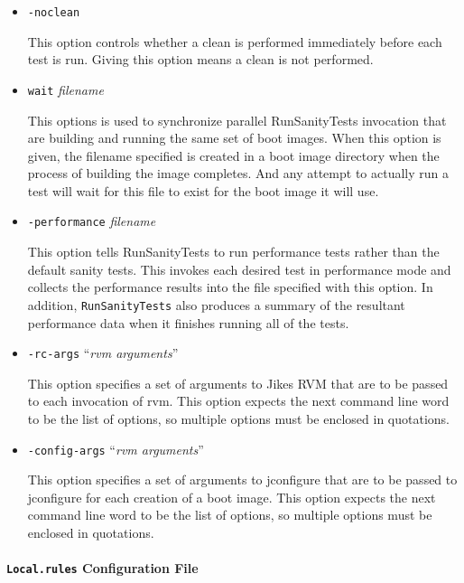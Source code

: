 \begin{itemize}
\item{\tt{-noclean}}

 This option controls whether a clean is performed immediately before
each test is run.  Giving this option means a clean is not performed.

\item{\tt{wait}} {\em filename}

 This options is used to synchronize parallel RunSanityTests invocation
that are building and running the same set of boot images.  When this
option is given, the filename specified is created in a boot image
directory when the process of building the image completes.  And any
attempt to actually run a test will wait for this file to exist for
the boot image it will use.

\item{\tt{-performance}} {\em filename}

 This option tells RunSanityTests to run performance tests rather than
the default sanity tests.  This invokes each desired test in
performance mode and collects the performance results into the file
specified with this option.  In addition, {\tt{RunSanityTests}} also
produces a summary of the resultant performance data when it finishes
running all of the tests.

\item{\tt{-rc-args}} ``{\em rvm arguments}''

 This option specifies a set of arguments to Jikes RVM that are to be
passed to each invocation of rvm.  This option expects the next
command line word to be the list of options, so multiple options must
be enclosed in quotations.

\item{\tt{-config-args}} ``{\em rvm arguments}''

 This option specifies a set of arguments to jconfigure that are to be
passed to jconfigure for each creation of a boot image.  This option
expects the next command line word to be the list of options, so
multiple options must be enclosed in quotations.

\end{itemize}

\paragraph{{\tt{Local.rules}} Configuration File}

